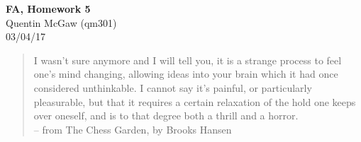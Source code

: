 \documentclass[11pt]{article}
\begin{document}
\begin{center} {\Large\bf FA, Homework 5}  \\ Quentin McGaw (qm301) \\ 03/04/17
\end{center}

\begin{quote}
I wasn't sure anymore and I will tell you, it is a strange
process to feel one's mind changing, allowing ideas into
your brain which it had once considered unthinkable. I
cannot say it's painful, or particularly pleasurable, but
that it requires a certain relaxation of the hold one keeps
over oneself, and is to that degree both a thrill and a 
horror.
\\ -- from The Chess Garden, by Brooks Hansen
\end{quote}
\end{document}
